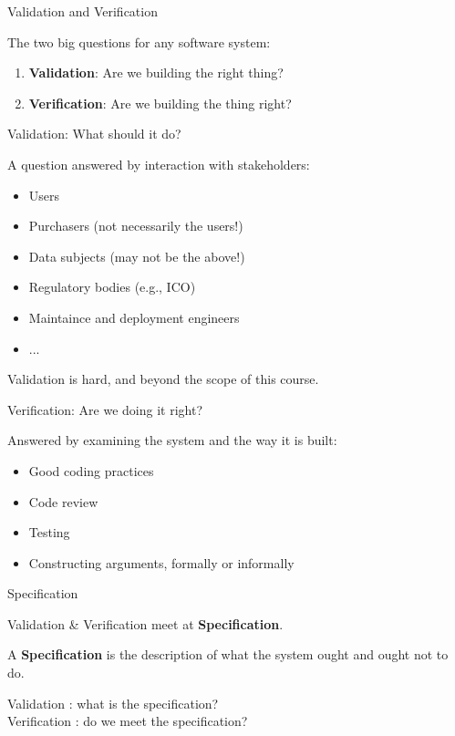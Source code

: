 \documentclass[xetex,aspectratio=169,14pt,hyperref={pdfpagelabels=true,pdflang={en-GB}}]{beamer}
\begin{document}
\begin{frame}
  {Validation and Verification}

  The two big questions for any software system:

  \bigskip

  \begin{enumerate}
  \item {\bf Validation}: Are we building the right thing?
  \item {\bf Verification}: Are we building the thing right?
  \end{enumerate}
\end{frame}

\begin{frame}
  {Validation: What should it do?}

  A question answered by interaction with stakeholders:
  \begin{itemize}
  \item Users
  \item Purchasers \quad \textcolor{black!60}{(not necessarily the users!)}
  \item Data subjects \quad \textcolor{black!60}{(may not be the above!)}
  \item Regulatory bodies \quad \textcolor{black!60}{(e.g., ICO)}
  \item Maintaince and deployment engineers
  \item ...
  \end{itemize}

  \pause
  \bigskip

  Validation is hard, and beyond the scope of this course.
\end{frame}

\begin{frame}
  {Verification: Are we doing it right?}

  Answered by examining the system and the way it is built:

  \bigskip

  \begin{itemize}
  \item Good coding practices
  \item Code review
  \item Testing
  \item Constructing arguments, formally or informally
  \end{itemize}
\end{frame}

\begin{frame}
  {Specification}

  Validation \& Verification meet at {\bf Specification}.

  \bigskip

  A {\bf Specification} is the description of what the system ought
  and ought not to do.

  \bigskip
  \pause

  Validation : what is the specification? \\
  Verification : do we meet the specification?
\end{frame}
\end{document}
